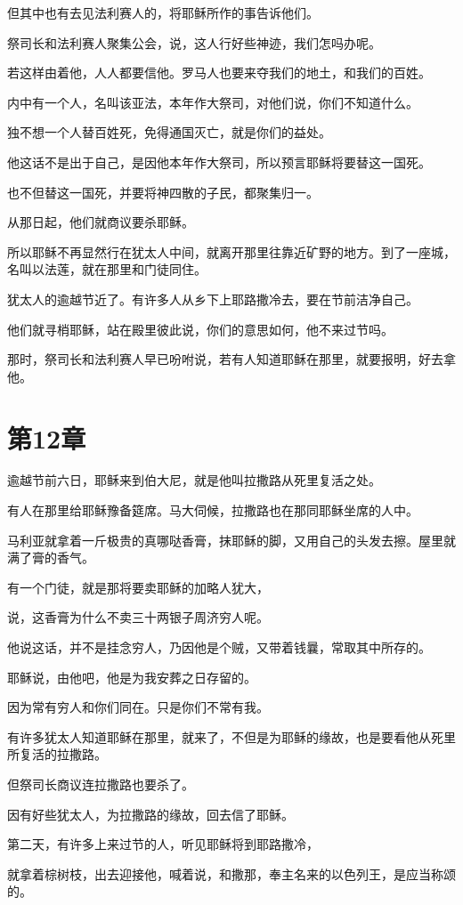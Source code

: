 \documentclass[12pt,oneside]{book}
\begin{document}
但其中也有去见法利赛人的，将耶稣所作的事告诉他们。

祭司长和法利赛人聚集公会，说，这人行好些神迹，我们怎吗办呢。

若这样由着他，人人都要信他。罗马人也要来夺我们的地土，和我们的百姓。

内中有一个人，名叫该亚法，本年作大祭司，对他们说，你们不知道什么。

独不想一个人替百姓死，免得通国灭亡，就是你们的益处。

他这话不是出于自己，是因他本年作大祭司，所以预言耶稣将要替这一国死。

也不但替这一国死，并要将神四散的子民，都聚集归一。

从那日起，他们就商议要杀耶稣。

所以耶稣不再显然行在犹太人中间，就离开那里往靠近矿野的地方。到了一座城，名叫以法莲，就在那里和门徒同住。

犹太人的逾越节近了。有许多人从乡下上耶路撒冷去，要在节前洁净自己。

他们就寻梢耶稣，站在殿里彼此说，你们的意思如何，他不来过节吗。

那时，祭司长和法利赛人早已吩咐说，若有人知道耶稣在那里，就要报明，好去拿他。

\chapter{第12章}
逾越节前六日，耶稣来到伯大尼，就是他叫拉撒路从死里复活之处。

有人在那里给耶稣豫备筵席。马大伺候，拉撒路也在那同耶稣坐席的人中。

马利亚就拿着一斤极贵的真哪哒香膏，抹耶稣的脚，又用自己的头发去擦。屋里就满了膏的香气。

有一个门徒，就是那将要卖耶稣的加略人犹大，

说，这香膏为什么不卖三十两银子周济穷人呢。

他说这话，并不是挂念穷人，乃因他是个贼，又带着钱曩，常取其中所存的。

耶稣说，由他吧，他是为我安葬之日存留的。

因为常有穷人和你们同在。只是你们不常有我。

有许多犹太人知道耶稣在那里，就来了，不但是为耶稣的缘故，也是要看他从死里所复活的拉撒路。

但祭司长商议连拉撒路也要杀了。

因有好些犹太人，为拉撒路的缘故，回去信了耶稣。

第二天，有许多上来过节的人，听见耶稣将到耶路撒冷，

就拿着棕树枝，出去迎接他，喊着说，和撒那，奉主名来的以色列王，是应当称颂的。
\end{document}
